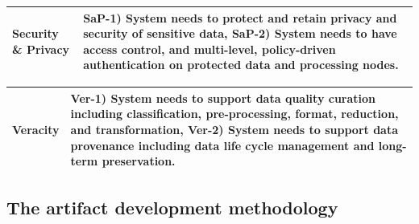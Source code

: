 \documentclass[review]{elsarticle}
\begin{document}
\begin{table}
\begin{tabular}{|m{1.2cm}|m{10.5cm}|}
        \hline

        Security \& Privacy & 
        
        \textbf{SaP-1)} System needs to protect and retain privacy and security of sensitive data, \textbf{SaP-2)} System needs to have access control, and multi-level, policy-driven authentication on protected data and processing nodes. 
        \\

        \hline
        
        
  
    \end{tabular}
    \label{table-requirements}
\end{table}


\begin{table}
    \centering
    \renewcommand*{\arraystretch}{1.4}
    \begin{tabular}{|m{1.2cm}|m{10.5cm}|}
        
        \hline

        Veracity &
                
        \textbf{Ver-1)} System needs to support data quality curation including classification, pre-processing, format, reduction, and  transformation, \textbf{Ver-2)} System needs to support data provenance including data life cycle management and long-term preservation.
        \\
        \hline

\end{tabular}
\end{table}


\subsection{The artifact development methodology}
\end{document}
